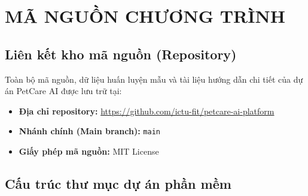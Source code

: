 
\chapter{MÃ NGUỒN CHƯƠNG TRÌNH}
\label{app:sourcecode}

\section{Liên kết kho mã nguồn (Repository)}

Toàn bộ mã nguồn, dữ liệu huấn luyện mẫu và tài liệu hướng dẫn chi tiết của dự án PetCare AI được lưu trữ tại:
\begin{itemize}[leftmargin=1.5cm]
    \item \textbf{Địa chỉ repository:} \url{https://github.com/ictu-fit/petcare-ai-platform}
    \item \textbf{Nhánh chính (Main branch):} \texttt{main}
    \item \textbf{Giấy phép mã nguồn:} MIT License
\end{itemize}

\section{Cấu trúc thư mục dự án phần mềm}

